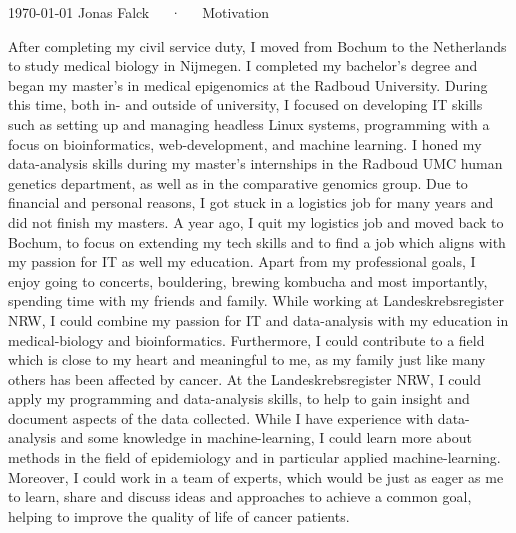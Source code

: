\documentclass[11pt, a4paper]{awesome-cv}
\begin{document}
\makecvheader[R]

\makecvfooter
  {\today}
  {Jonas Falck~~~·~~~Motivation}
  {}

\makelettertitle
\begin{cvletter}

After completing my civil service duty, I moved from Bochum to the Netherlands to study medical biology in Nijmegen.
I completed my bachelor’s degree and began my master's in medical epigenomics at the Radboud University.
During this time, both in- and outside of university, I focused on developing IT skills such as setting up and managing headless Linux systems, programming with a focus on bioinformatics, web-development, and machine learning.
I honed my data-analysis skills during my master's internships in the Radboud UMC human genetics department, as well as in the comparative genomics group.
Due to financial and personal reasons, I got stuck in a logistics job for many years and did not finish my masters.
A year ago, I quit my logistics job and moved back to Bochum, to focus on extending my tech skills and to find a job which aligns with my passion for IT as well my education.
Apart from my professional goals, I enjoy going to concerts, bouldering, brewing kombucha and most importantly, spending time with my friends and family.
While working at Landeskrebsregister NRW, I could combine my passion for IT and data-analysis with my education in medical-biology and bioinformatics.
Furthermore, I could contribute to a field which is close to my heart and meaningful to me, as my family just like many others has been affected by cancer.
At the Landeskrebsregister NRW, I could apply my programming and data-analysis skills, to help to gain insight and document aspects of the data collected.
While I have experience with data-analysis and some knowledge in machine-learning, I could learn more about methods in the field of epidemiology and in particular applied machine-learning.
Moreover, I could work in a team of experts, which would be just as eager as me to learn, share and discuss ideas and approaches to achieve a common goal, helping to improve the quality of life of cancer patients.

\end{cvletter}
\end{document}
